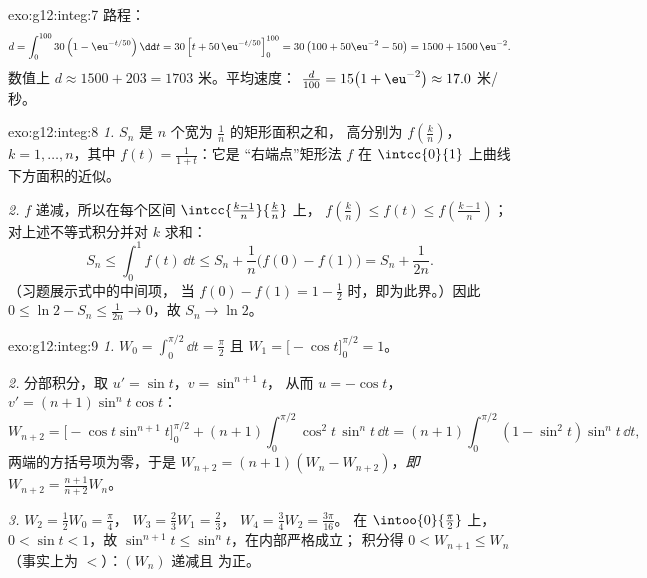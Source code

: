 \begin{solution}{exo:g12:integ:7}
路程：
\[
d = \int_0^{100} 30\left(1 - \eu^{-t/50}\right)\dd t
= 30\left[t + 50\,\eu^{-t/50}\right]_0^{100}
= 30\left(100 + 50\eu^{-2} - 50\right)
= 1500 + 1500\,\eu^{-2}.
\]
数值上 $d \approx 1500 + 203 = 1703$ 米。平均速度：
$\frac{d}{100} = 15\bigl(1 + \eu^{-2}\bigr) \approx 17.0$ 米/秒。
\end{solution}

\begin{solution}{exo:g12:integ:8}
\emph{1.} $S_n$ 是 $n$ 个宽为 $\frac1n$ 的矩形面积之和，
高分别为 $f\left(\frac kn\right)$，$k = 1, \dots, n$，其中
$f(t) = \frac{1}{1+t}$：它是 “右端点”矩形法
$f$ 在 $\intcc{0}{1}$ 上曲线下方面积的近似。

\emph{2.} $f$ 递减，所以在每个区间
$\intcc{\frac{k-1}{n}}{\frac kn}$ 上，
$f\left(\frac kn\right) \leq f(t) \leq f\left(\frac{k-1}{n}\right)$；
对上述不等式积分并对 $k$ 求和：
\[
S_n \leq \int_0^1 f(t)\,\dd t \leq S_n + \frac1n\bigl(f(0) - f(1)\bigr)
= S_n + \frac{1}{2n}.
\]
（习题展示式中的中间项，
当 $f(0) - f(1) = 1 - \frac12$ 时，即为此界。）因此
$0 \leq \ln 2 - S_n \leq \frac{1}{2n} \to 0$，故 $S_n \to \ln 2$。
\end{solution}

\begin{solution}{exo:g12:integ:9}
\emph{1.} $W_0 = \int_0^{\pi/2} \dd t = \frac{\pi}{2}$ 且
$W_1 = \bigl[-\cos t\bigr]_0^{\pi/2} = 1$。

\emph{2.} 分部积分，取 $u' = \sin t$，$v = \sin^{n+1} t$，
从而 $u = -\cos t$，$v' = (n+1)\sin^n t \cos t$：
\[
W_{n+2} = \bigl[-\cos t \sin^{n+1} t\bigr]_0^{\pi/2}
+ (n+1)\int_0^{\pi/2} \cos^2 t\,\sin^n t\,\dd t
= (n+1)\int_0^{\pi/2} (1 - \sin^2 t)\sin^n t\,\dd t,
\]
两端的方括号项为零，于是
$W_{n+2} = (n+1)(W_n - W_{n+2})$，\emph{即}
$W_{n+2} = \frac{n+1}{n+2} W_n$。

\emph{3.} $W_2 = \frac12 W_0 = \frac{\pi}{4}$，
$W_3 = \frac23 W_1 = \frac23$，
$W_4 = \frac34 W_2 = \frac{3\pi}{16}$。
在 $\intoo{0}{\frac\pi2}$ 上，$0 < \sin t < 1$，故
$\sin^{n+1} t \leq \sin^n t$，在内部严格成立；
积分得 $0 < W_{n+1} \leq W_n$（事实上为 $<$）：$(W_n)$ 递减且
为正。
\end{solution}

